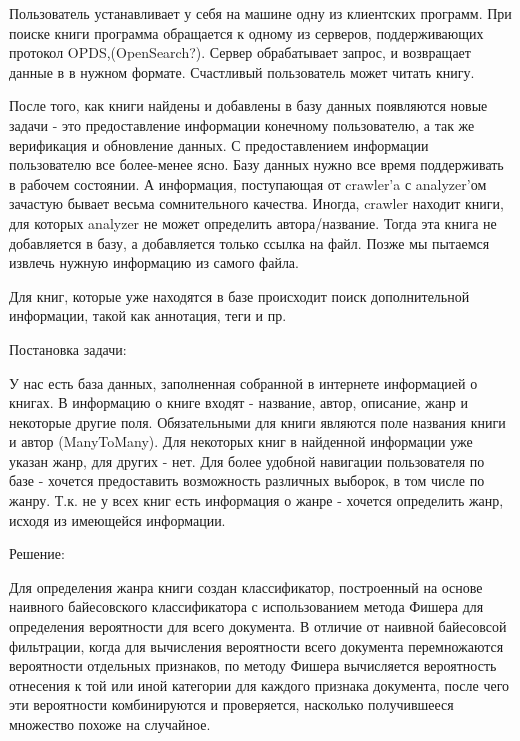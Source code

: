 \documentclass[a4paper]{report}
\begin{document}

Пользователь устанавливает у себя на машине одну из клиентских программ. При поиске книги программа обращается к одному из серверов, поддерживающих протокол OPDS,(OpenSearch?). Сервер обрабатывает запрос, и возвращает данные в в нужном формате. Счастливый пользователь может читать книгу.



После того, как книги найдены и добавлены в базу данных появляются новые задачи - это предоставление информации конечному пользователю, а так же верификация и обновление данных. С предоставлением информации пользователю все более-менее ясно. Базу данных нужно все время поддерживать в рабочем состоянии. А информация, поступающая от crawler'a с analyzer'ом зачастую бывает весьма сомнительного качества. Иногда, crawler находит книги, для которых analyzer не может определить автора/название. Тогда эта книга не добавляется в базу, а добавляется только ссылка на файл. Позже мы пытаемся извлечь нужную информацию из самого файла.

Для книг, которые уже находятся в базе происходит поиск дополнительной информации, такой как аннотация, теги и пр.


Постановка задачи:

У нас есть база данных, заполненная собранной в интернете информацией о книгах. В информацию о книге входят - название, автор, описание, жанр и некоторые другие поля. Обязательными для книги являются поле названия книги и автор (ManyToMany). Для некоторых книг в найденной информации уже указан жанр, для других - нет. Для более удобной навигации пользователя по базе - хочется предоставить возможность различных выборок, в том числе по жанру. Т.к. не у всех книг есть информация о жанре - хочется определить жанр, исходя из имеющейся информации. 

Решение:

Для определения жанра книги создан классификатор, построенный на основе наивного байесовского классификатора с использованием метода Фишера для определения вероятности для всего документа. В отличие от наивной байесовсой фильтрации, когда для вычисления вероятности всего документа перемножаются вероятности отдельных признаков, по методу Фишера вычисляется вероятность отнесения к той или иной категории для каждого признака документа, после чего эти вероятности комбинируются и проверяется, насколько получившееся множество похоже на случайное.
\end{document}
